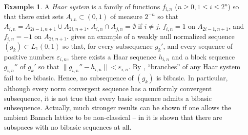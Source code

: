 \documentclass[12pt,leqno]{amsart}
\numberwithin{equation}{section}
\theoremstyle{definition}
\newtheorem{example}[theorem]{Example}
\newcommand{\timur}[1]{{\textcolor{blue}{{\bf T.O:} #1}}}
\begin{document}

\begin{example}\label{bad weakly null}
A \emph{Haar system} is a family of functions $f_{i,n}$ ($n \geq 0, 1 \leq i \leq 2^n$) so that there exist sets $A_{i.n} \subset (0,1)$ of measure $2^{-n}$ so that $A_{i,n} = A_{2i-1,n+1} \cup A_{2i,n+1}$, $A_{i,n} \cap A_{j,n} = \emptyset$ if $i \neq j$, $f_{i,n} = 1$ on $A_{2i-1,n+1}$, and $f_{i,n} = -1$ on $A_{2i,n+1}$.
\cite{JMS07} gives an example of a weakly null normalized sequence $(g_k) \subset L_1(0,1)$ so that, for every subsequence $g_k'$, and every sequence of positive numbers $\varepsilon_{i,n}$, there exists a Haar sequence $h_{i,n}$ and a block sequence $g_{i,n}''$ of $g_k'$ so that $\|g_{i,n}'' - h_{i,n}\| < \varepsilon_{i,n}$.
By \cite[Theorem 4.6]{GKP}, ``branches'' of any Haar system fail to be bibasic. Hence, no subsequence of $(g_k)$ is bibasic. In particular, although every norm convergent sequence has a uniformly convergent subsequence, it is not true that every basic sequence admits a bibasic subsequence. Actually, much stronger results can be shown if one allows the ambient Banach lattice to be non-classical -- in \cite[Theorem 7.5]{OTTT} it is shown that there are subspaces with no bibasic sequences at all.
\end{example}
\end{document}
